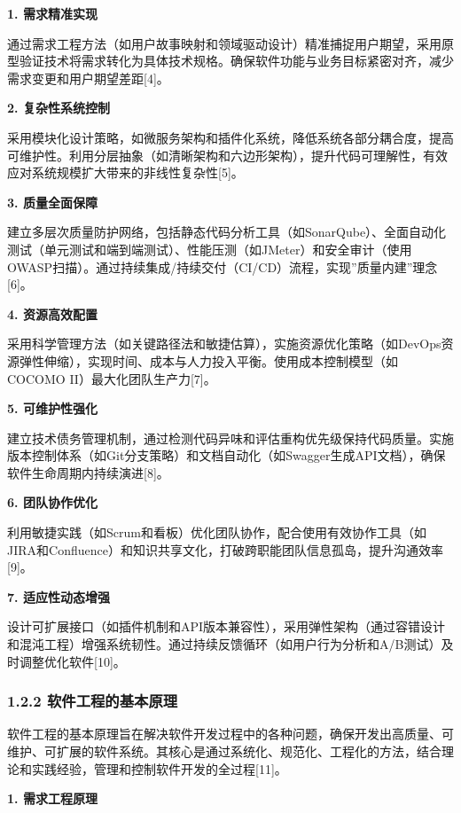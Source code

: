 \documentclass[12pt,a4paper]{article}
\begin{document}
\textbf{1. 需求精准实现}

通过需求工程方法（如用户故事映射和领域驱动设计）精准捕捉用户期望，采用原型验证技术将需求转化为具体技术规格。确保软件功能与业务目标紧密对齐，减少需求变更和用户期望差距{[}4{]}。

\textbf{2. 复杂性系统控制}

采用模块化设计策略，如微服务架构和插件化系统，降低系统各部分耦合度，提高可维护性。利用分层抽象（如清晰架构和六边形架构），提升代码可理解性，有效应对系统规模扩大带来的非线性复杂性{[}5{]}。

\textbf{3. 质量全面保障}

建立多层次质量防护网络，包括静态代码分析工具（如SonarQube）、全面自动化测试（单元测试和端到端测试）、性能压测（如JMeter）和安全审计（使用OWASP扫描）。通过持续集成/持续交付（CI/CD）流程，实现''质量内建''理念{[}6{]}。

\textbf{4. 资源高效配置}

采用科学管理方法（如关键路径法和敏捷估算），实施资源优化策略（如DevOps资源弹性伸缩），实现时间、成本与人力投入平衡。使用成本控制模型（如COCOMO
II）最大化团队生产力{[}7{]}。

\textbf{5. 可维护性强化}

建立技术债务管理机制，通过检测代码异味和评估重构优先级保持代码质量。实施版本控制体系（如Git分支策略）和文档自动化（如Swagger生成API文档），确保软件生命周期内持续演进{[}8{]}。

\textbf{6. 团队协作优化}

利用敏捷实践（如Scrum和看板）优化团队协作，配合使用有效协作工具（如JIRA和Confluence）和知识共享文化，打破跨职能团队信息孤岛，提升沟通效率{[}9{]}。

\textbf{7. 适应性动态增强}

设计可扩展接口（如插件机制和API版本兼容性），采用弹性架构（通过容错设计和混沌工程）增强系统韧性。通过持续反馈循环（如用户行为分析和A/B测试）及时调整优化软件{[}10{]}。

\subsubsection{1.2.2
软件工程的基本原理}\label{ux8f6fux4ef6ux5de5ux7a0bux7684ux57faux672cux539fux7406}

软件工程的基本原理旨在解决软件开发过程中的各种问题，确保开发出高质量、可维护、可扩展的软件系统。其核心是通过系统化、规范化、工程化的方法，结合理论和实践经验，管理和控制软件开发的全过程{[}11{]}。

\textbf{1. 需求工程原理}
\end{document}
